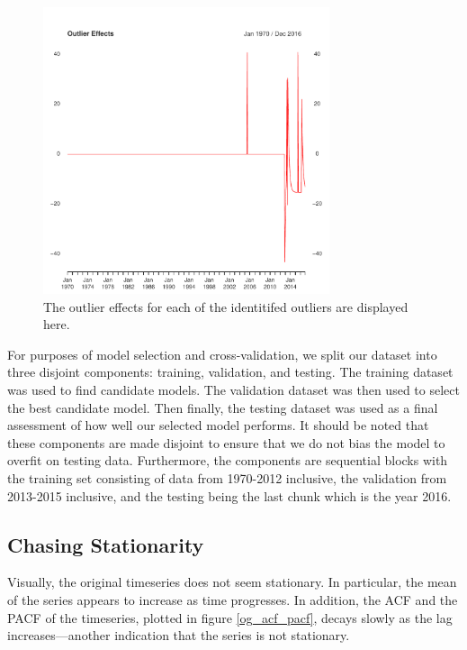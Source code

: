 \documentclass[11pt]{paper}
\begin{document}
\begin{figure}
\centering
    \includegraphics[width=0.75\textwidth]{../image/outlier_effects.pdf}
\caption{The outlier effects for each of the identitifed outliers are displayed here.}
\label{outlier_effect}
\end{figure}

For purposes of model selection and cross-validation, we split our dataset into three disjoint components: training, validation, and testing. The training dataset was used to find candidate models. The validation dataset was then used to select the best candidate model. Then finally, the testing dataset was used as a final assessment of how well our selected model performs. It should be noted that these components are made disjoint to ensure that we do not bias the model to overfit on testing data. Furthermore, the components are sequential blocks with the training set consisting of data from 1970-2012 inclusive, the validation from 2013-2015 inclusive, and the testing being the last chunk which is the year 2016.


\subsection{Chasing Stationarity}
Visually, the original timeseries does not seem stationary. In particular, the mean of the series appears to increase as time progresses. In addition, the ACF and the PACF of the timeseries, plotted in figure \ref{og_acf_pacf}, decays slowly as the lag increases---another indication that the series is not stationary.
\end{document}
